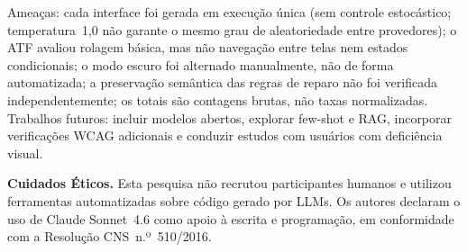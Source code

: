\documentclass[sigconf,review]{webmedia}
\begin{document}
Ameaças: cada interface foi gerada em execução única (sem controle
estocástico; temperatura~1,0 não garante o mesmo grau de aleatoriedade
entre provedores); o ATF avaliou rolagem básica, mas não navegação entre
telas nem estados condicionais; o modo escuro foi alternado manualmente,
não de forma automatizada; a preservação semântica das regras de reparo
não foi verificada independentemente; os totais são contagens brutas, não
taxas normalizadas. Trabalhos futuros: incluir modelos abertos, explorar
few-shot e RAG, incorporar verificações WCAG adicionais e conduzir estudos
com usuários com deficiência visual.

\smallskip\noindent\textbf{Cuidados Éticos.} Esta pesquisa não recrutou
participantes humanos e utilizou ferramentas automatizadas sobre código
gerado por LLMs. Os autores declaram o uso de Claude Sonnet~4.6 como
apoio à escrita e programação, em conformidade com a Resolução
CNS~n.º~510/2016.



\end{document}
